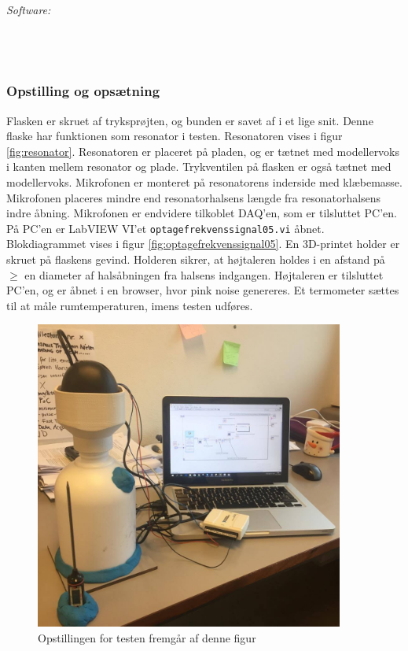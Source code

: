 	\textit{Software:}\\
	\labview\\
	\daqsoft\\
	\onlineg\\
	
		\subsubsection{Opstilling og opsætning}
	Flasken er skruet af tryksprøjten, og bunden er savet af i et lige snit. Denne flaske har funktionen som resonator i testen. Resonatoren vises i figur \ref{fig:resonator}. Resonatoren er placeret på pladen, og er tætnet med modellervoks i kanten mellem resonator og plade. Trykventilen på flasken er også tætnet med modellervoks.
Mikrofonen er monteret på resonatorens inderside med klæbemasse. Mikrofonen placeres mindre end resonatorhalsens længde fra  resonatorhalsens indre åbning. Mikrofonen er endvidere tilkoblet DAQ'en, som er tilsluttet PC'en. På PC'en er LabVIEW VI'et \texttt{optagefrekvenssignal05.vi} åbnet. Blokdiagrammet vises i figur \ref{fig:optagefrekvenssignal05}. En 3D-printet holder er skruet på flaskens gevind. Holderen sikrer, at højtaleren holdes i en afstand på $\geq$ en diameter af halsåbningen fra halsens indgangen. Højtaleren er tilsluttet PC'en, og \onlineg er åbnet i en browser, hvor pink noise genereres. 
	Et termometer sættes til at måle rumtemperaturen, imens testen udføres. 
	
	\begin{figure}[htb]
	\centering
		\includegraphics[width=4in]{bordtest61.jpg}	
		\caption{Opstillingen for testen fremgår af denne figur}
		\label{bordetest61op}
	\end{figure}
	
